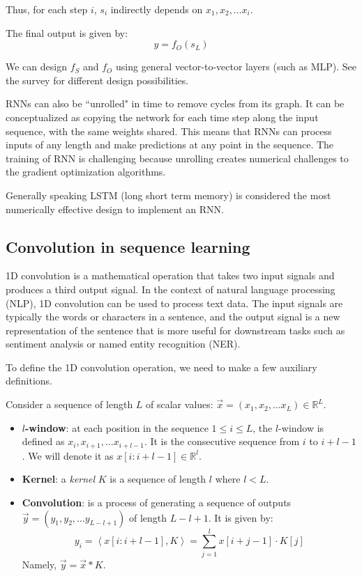 Thus, for each step $i$, $s_i$ indirectly depends on $x_1, x_2, \dots x_i$.

The final output is given by:
$$
y = f_O(s_L)
$$

We can design $f_S$ and $f_O$ using general vector-to-vector layers (such as MLP).  See the survey \cite{yu2019review} for different design possibilities.  

RNNs can also be ``unrolled" in time to remove cycles from its graph. It can be conceptualized as copying the network for each time step along the input sequence, with the same weights shared. This means that RNNs can process inputs of any length and make predictions at any point in the sequence.  The training of RNN is challenging because unrolling creates numerical challenges to the gradient optimization algorithms.

Generally speaking LSTM (long short term memory) is considered the most numerically effective design to implement an RNN.

\subsection{Convolution in sequence learning}
\label{sec:cnn}
1D convolution is a mathematical operation that takes two input signals and produces a third output signal. In the context of natural language processing (NLP), 1D convolution can be used to process text data. The input signals are typically the words or characters in a sentence, and the output signal is a new representation of the sentence that is more useful for downstream tasks such as sentiment analysis or named entity recognition (NER).

To define the 1D convolution operation, we need to make a few auxiliary definitions.

Consider a sequence of length $L$ of scalar values: $\vec{x} = (x_1, x_2, \dots x_L) \in\mathbb{R}^L$.

\begin{itemize}
    \item {\bf $l$-window}: at each position in the sequence $1\leq i\leq L$, the $l$-window
    is defined as $x_{i}, x_{i+1}, \dots  x_{i+l-1}$.  It is the consecutive sequence from $i$ to $i+l-1$.
    We will denote it as $x[i:i+l-1] \in \mathbb{R}^{l}$.

    \item {\bf Kernel}: a {\em kernel} $K$ is a sequence of length $l$ where $l < L$.

    \item {\bf Convolution}: is a process of generating a sequence of outputs $\vec{y} = (y_1, y_2, \dots y_{L-l+1})$ of length $L-l+1$.  It is given by:
    $$
    y_i = \left<x[i:i+l-1], K\right> = \sum_{j=1}^l x[i+j-1]\cdot K[j]
    $$
    Namely, $\vec y = \vec x * K$.
\end{itemize}

